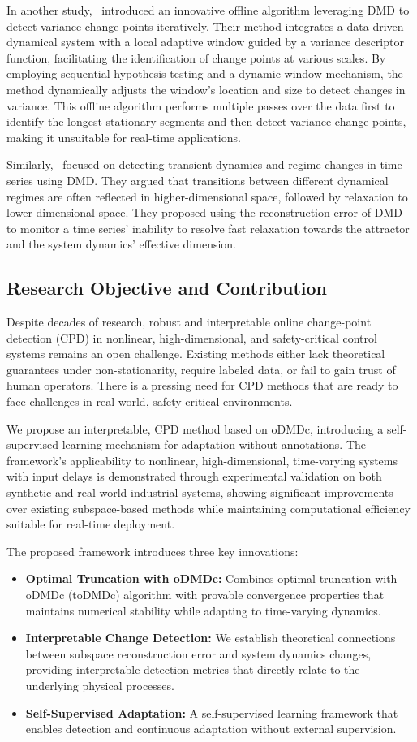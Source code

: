 In another study,~\cite{Srivastava2017} introduced an innovative offline algorithm leveraging DMD to detect variance change points iteratively. Their method integrates a data-driven dynamical system with a local adaptive window guided by a variance descriptor function, facilitating the identification of change points at various scales. By employing sequential hypothesis testing and a dynamic window mechanism, the method dynamically adjusts the window's location and size to detect changes in variance. This offline algorithm performs multiple passes over the data first to identify the longest stationary segments and then detect variance change points, making it unsuitable for real-time applications.

Similarly,~\cite{Gottwald2020} focused on detecting transient dynamics and regime changes in time series using DMD\@. They argued that transitions between different dynamical regimes are often reflected in higher-dimensional space, followed by relaxation to lower-dimensional space. They proposed using the reconstruction error of DMD to monitor a time series' inability to resolve fast relaxation towards the attractor and the system dynamics' effective dimension.

\subsection{Research Objective and Contribution}
Despite decades of research, robust and interpretable online change-point detection (CPD) in nonlinear, high-dimensional, and safety-critical control systems remains an open challenge. Existing methods either lack theoretical guarantees under non-stationarity, require labeled data, or fail to gain trust of human operators. There is a pressing need for CPD methods that are ready to face challenges in real-world, safety-critical environments.

We propose an interpretable, CPD method based on oDMDc, introducing a self-supervised learning mechanism for adaptation without annotations. The framework's applicability to nonlinear, high-dimensional, time-varying systems with input delays is demonstrated through experimental validation on both synthetic and real-world industrial systems, showing significant improvements over existing subspace-based methods while maintaining computational efficiency suitable for real-time deployment.

The proposed framework introduces three key innovations:
\begin{itemize}
	\item \textbf{Optimal Truncation with oDMDc:} Combines optimal truncation with oDMDc (toDMDc) algorithm with provable convergence properties that maintains numerical stability while adapting to time-varying dynamics.
	\item \textbf{Interpretable Change Detection:} We establish theoretical connections between subspace reconstruction error and system dynamics changes, providing interpretable detection metrics that directly relate to the underlying physical processes.
	\item \textbf{Self-Supervised Adaptation:} A self-supervised learning framework that enables detection and continuous adaptation without external supervision.
\end{itemize}
